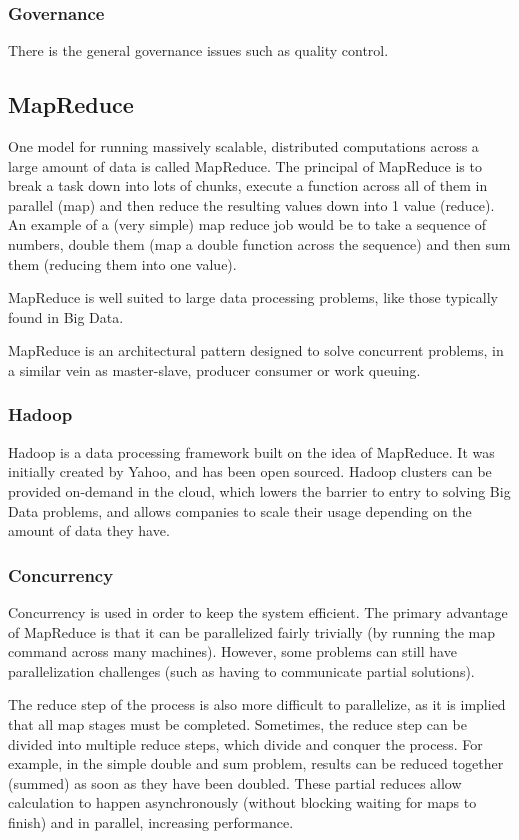 \documentclass{article}
\begin{document}
\subsubsection{Governance}
There is the general governance issues such as quality control. 

\subsection{MapReduce}
One model for running massively scalable, distributed computations across a large amount of data is called MapReduce. The principal of MapReduce is to break a task down into lots of chunks, execute a function across all of them in parallel (map) and then reduce the resulting values down into 1 value (reduce). An example of a (very simple) map reduce job would be to take a sequence of numbers, double them (map a double function across the sequence) and then sum them (reducing them into one value).

MapReduce is well suited to large data processing problems, like those typically found in Big Data. 

MapReduce is an architectural pattern designed to solve concurrent problems, in a similar vein as master-slave, producer consumer or work queuing. 

\subsubsection{Hadoop}
Hadoop is a data processing framework built on the idea of MapReduce. It was initially created by Yahoo, and has been open sourced. Hadoop clusters can be provided on-demand in the cloud, which lowers the barrier to entry to solving Big Data problems, and allows companies to scale their usage depending on the amount of data they have. 

\subsubsection{Concurrency}
Concurrency is used in order to keep the system efficient. The primary advantage of MapReduce is that it can be parallelized fairly trivially (by running the map command across many machines). However, some problems can still have parallelization challenges (such as having to communicate partial solutions).

The reduce step of the process is also more difficult to parallelize, as it is implied that all map stages must be completed. Sometimes, the reduce step can be divided into multiple reduce steps, which divide and conquer the process. For example, in the simple double and sum problem, results can be reduced together (summed) as soon as they have been doubled. These partial reduces allow calculation to happen asynchronously (without blocking waiting for maps to finish) and in parallel, increasing performance.
\end{document}
